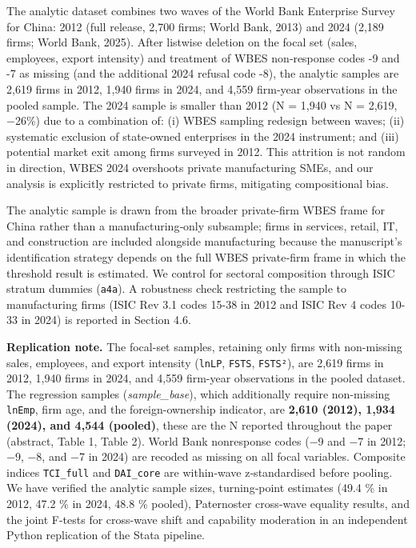 \documentclass[
  12pt,a4paper]{article}
\begin{document}
The analytic dataset combines two waves of the World Bank Enterprise
Survey for China: 2012 (full release, 2,700 firms; World Bank, 2013) and
2024 (2,189 firms; World Bank, 2025). After listwise deletion on the
focal set (sales, employees, export intensity) and treatment of WBES
non‑response codes -9 and -7 as missing (and the additional 2024 refusal
code -8), the analytic samples are 2,619 firms in 2012, 1,940 firms in
2024, and 4,559 firm‑year observations in the pooled sample. The 2024
sample is smaller than 2012 (N = 1,940 vs N = 2,619, −26\%) due to a
combination of: (i) WBES sampling redesign between waves; (ii)
systematic exclusion of state-owned enterprises in the 2024 instrument;
and (iii) potential market exit among firms surveyed in 2012. This
attrition is not random in direction, WBES 2024 overshoots private
manufacturing SMEs, and our analysis is explicitly restricted to private
firms, mitigating compositional bias.

The analytic sample is drawn from the broader private‑firm WBES frame
for China rather than a manufacturing‑only subsample; firms in services,
retail, IT, and construction are included alongside manufacturing
because the manuscript's identification strategy depends on the full
WBES private‑firm frame in which the threshold result is estimated. We
control for sectoral composition through ISIC stratum dummies
(\texttt{a4a}). A robustness check restricting the sample to
manufacturing firms (ISIC Rev 3.1 codes 15-38 in 2012 and ISIC Rev 4
codes 10-33 in 2024) is reported in Section 4.6.

\textbf{Replication note.} The focal-set samples, retaining only firms
with non-missing sales, employees, and export intensity (\texttt{lnLP},
\texttt{FSTS}, \texttt{FSTS²}), are 2,619 firms in 2012, 1,940 firms in
2024, and 4,559 firm-year observations in the pooled dataset. The
regression samples (\emph{sample\_base}), which additionally require
non-missing \texttt{lnEmp}, firm age, and the foreign-ownership
indicator, are \textbf{2,610 (2012), 1,934 (2024), and 4,544 (pooled)},
these are the N reported throughout the paper (abstract, Table 1, Table
2). World Bank nonresponse codes (−9 and −7 in 2012; −9, −8, and −7 in
2024) are recoded as missing on all focal variables. Composite indices
\texttt{TCI\_full} and \texttt{DAI\_core} are within‑wave z‑standardised
before pooling. We have verified the analytic sample sizes,
turning‑point estimates (49.4 \% in 2012, 47.2 \% in 2024, 48.8 \%
pooled), Paternoster cross‑wave equality results, and the joint F-tests
for cross-wave shift and capability moderation in an independent Python
replication of the Stata pipeline.
\end{document}
